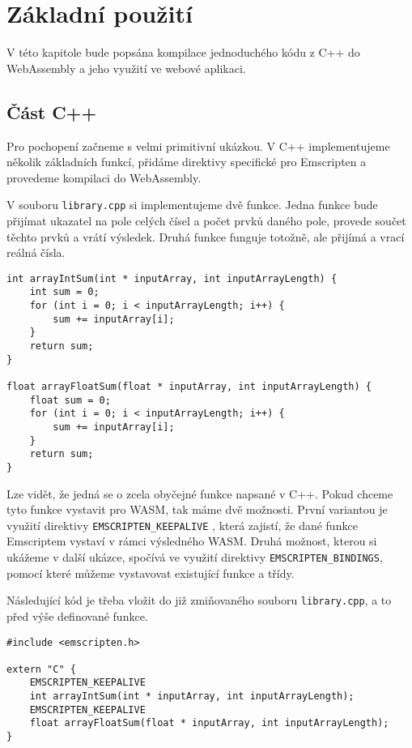 \documentclass{{template/ctuthesis}}
\begin{document}
\section{Základní použití}

V této kapitole bude popsána kompilace jednoduchého kódu z C++ do WebAssembly a jeho využití ve webové aplikaci. 

\subsection{Část C++}

Pro pochopení začneme s velmi primitivní ukázkou. V C++ implementujeme několik základních funkcí, přidáme direktivy specifické pro Emscripten a provedeme kompilaci do WebAssembly.

V souboru \texttt{library.cpp} si implementujeme dvě funkce. Jedna funkce bude přijímat ukazatel na pole celých čísel a počet prvků daného pole, provede součet těchto prvků a vrátí výsledek. Druhá funkce funguje totožně, ale přijímá a vrací reálná čísla.

\begin{verbatim}
int arrayIntSum(int * inputArray, int inputArrayLength) {
    int sum = 0;
    for (int i = 0; i < inputArrayLength; i++) {
        sum += inputArray[i];
    }
    return sum;
}

float arrayFloatSum(float * inputArray, int inputArrayLength) {
    float sum = 0;
    for (int i = 0; i < inputArrayLength; i++) {
        sum += inputArray[i];
    }
    return sum;
}  
\end{verbatim}

Lze vidět, že jedná se o zcela obyčejné funkce napsané v C++. Pokud chceme tyto funkce vystavit pro WASM, tak máme dvě možnosti. První variantou je využití direktivy \texttt{EMSCRIPTEN\_KEEPALIVE} \cite{wasm-complile-c}, která zajistí, že dané funkce Emscriptem vystaví v rámci výsledného WASM. Druhá možnost, kterou si ukážeme v další ukázce, spočívá ve využití direktivy \texttt{EMSCRIPTEN\_BINDINGS}, pomocí které můžeme vystavovat existující funkce a třídy.

Následující kód je třeba vložit do již zmiňovaného souboru \texttt{library.cpp}, a to před výše definované funkce.


\begin{verbatim}
#include <emscripten.h>

extern "C" {
    EMSCRIPTEN_KEEPALIVE
    int arrayIntSum(int * inputArray, int inputArrayLength);
    EMSCRIPTEN_KEEPALIVE
    float arrayFloatSum(float * inputArray, int inputArrayLength);
}
\end{verbatim}
\end{document}
